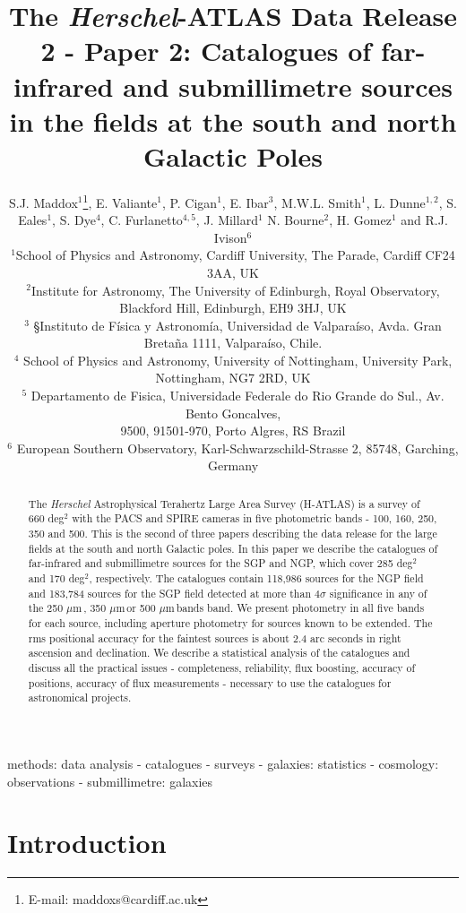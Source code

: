 \documentclass[useAMS,usenatbib]{mn2e}
\title[The \textit{Herschel}-ATLAS Data Release 2]{The \textit{Herschel}-ATLAS 
Data Release 2 - Paper 2: Catalogues
of far-infrared and submillimetre sources in the 
fields at the south and north Galactic Poles}
\author[S.J. Maddox]{S.J. Maddox$^{1}$\thanks{E-mail:
maddoxs@cardiff.ac.uk}, E. Valiante$^1$, P. Cigan$^1$, E. Ibar$^3$, M.W.L. Smith$^1$,
\newauthor
L. Dunne$^{1,2}$, S. Eales$^1$, S. Dye$^4$, C. Furlanetto$^{4,5}$, J. Millard$^1$
\newauthor 
N. Bourne$^2$,
H. Gomez$^1$ and R.J. Ivison$^6$\\
$^{1}$School of Physics and Astronomy, Cardiff University, The Parade, Cardiff CF24 3AA, UK\\
$^2$Institute for Astronomy, The University of Edinburgh, Royal Observatory, Blackford Hill,
Edinburgh, EH9 3HJ, UK\\
$^3$ §Instituto de F\'isica y Astronom\'ia, Universidad de Valpara\'iso, Avda. Gran Breta\~na 1111, Valpara\'iso, Chile.\\
$^4$ School of Physics and Astronomy, University of Nottingham, University Park, Nottingham,
NG7 2RD, UK\\
$^5$ Departamento de Fisica, Universidade Federale do Rio Grande do Sul., Av. Bento Goncalves,\\
9500, 91501-970, Porto Algres, RS Brazil\\
$^6$ European Southern Observatory, Karl-Schwarzschild-Strasse 2, 85748, Garching, Germany}
\def\mic{ $\mu $m\,}
\begin{document}
\date{}

\pagerange{\pageref{firstpage}--\pageref{lastpage}}

\maketitle

\label{firstpage}

\begin{abstract}

The {\it Herschel} Astrophysical Terahertz Large Area Survey
(H-ATLAS) is a survey of 660 deg$^2$ with the PACS and SPIRE cameras
in five photometric bands - 100, 160, 250, 350 and 500\micron.
This is the second of three papers describing the data release
for the large fields at the south and north Galactic poles.
In this paper
we describe the catalogues of far-infrared and submillimetre
sources for the SGP and NGP, which cover 285 deg$^2$ and 170 deg$^2$,
respectively.
The catalogues contain
118,986 sources for the NGP field and 183,784 sources for the
SGP field detected at
more than 4$\sigma$ significance in any of the 250\mic, 350\mic or
500\mic bands band. We present photometry in all five bands for
each source, including aperture photometry for sources known to
be extended. 
The rms positional accuracy for the faintest
sources is about 2.4 arc seconds in right ascension and
declination.
We describe a statistical analysis of the catalogues
and discuss all the practical issues - completeness, reliability,
flux boosting, accuracy of positions, accuracy of flux measurements - necessary to
use the catalogues for astronomical projects.


\end{abstract}

\begin{keywords}

methods: data analysis - catalogues - surveys - galaxies: statistics - cosmology:
observations - submillimetre: galaxies

\end{keywords}

\section{Introduction}
\end{document}
